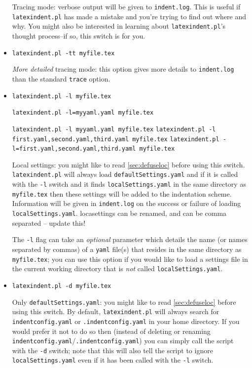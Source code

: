 \documentclass[11pt]{article}
\newcommand{\verbitem}[1]{\small\PVerb{#1}}
\begin{document}
\begin{itemize}[labelsep=.25cm]
	      \label{page:traceswitch}
	      Tracing mode: verbose output will be given to \lstinline!indent.log!. This
	      is useful if \lstinline!latexindent.pl! has made a mistake and you're
	      trying to find out where and why. You might also be interested in learning
	      about \lstinline!latexindent.pl!'s thought process--if so, this
	      switch is for you.
	\item[\verbitem{-tt, --ttrace}] \lstinline!latexindent.pl -tt myfile.tex!

      \emph{More detailed} tracing mode: this option gives more details to \lstinline!indent.log!
      than the standard \lstinline!trace! option.
	\item[\verbitem{-l, --local[=myyaml.yaml]}] \lstinline!latexindent.pl -l myfile.tex!

\lstinline!latexindent.pl -l=myyaml.yaml myfile.tex!

\lstinline!latexindent.pl -l myyaml.yaml myfile.tex!
\lstinline!latexindent.pl -l first.yaml,second.yaml,third.yaml myfile.tex!
\lstinline!latexindent.pl -l=first.yaml,second.yaml,third.yaml myfile.tex!


	      \label{page:localswitch}
	      Local settings: you might like to read \cref{sec:defuseloc} before
	      using this switch. \lstinline!latexindent.pl! will always load \lstinline!defaultSettings.yaml!
	      and if it is called with the \lstinline!-l! switch and it finds \lstinline!localSettings.yaml!
	      in the same directory as \lstinline!myfile.tex! then these settings will be
	      added to the indentation scheme. Information will be given in \lstinline!indent.log! on
	      the success or failure of loading \lstinline!localSettings.yaml!.
          {\huge locasettings can be renamed, and can be comma separated -- update this!}

The \lstinline!-l! flag can take an \emph{optional} parameter which details the name (or names separated by commas) of a \lstinline!yaml! file(s)
that resides in the same directory as \lstinline!myfile.tex!; you can use this option if you would 
like to load a settings file in the current working directory that is \emph{not} called \lstinline!localSettings.yaml!.

	\item[\verbitem{-d, --onlydefault}] \lstinline!latexindent.pl -d myfile.tex!

	      Only \lstinline!defaultSettings.yaml!: you might like to read \cref{sec:defuseloc} before
	      using this switch. By default, \lstinline!latexindent.pl! will always search for
	      \lstinline!indentconfig.yaml! or \lstinline!.indentconfig.yaml!  in your home directory. If you would prefer it not to do so
	      then (instead of deleting or renaming \lstinline!indentconfig.yaml!/\lstinline!.indentconfig.yaml!) you can simply
	      call the script with the \lstinline!-d! switch; note that this will also tell
	      the script to ignore \lstinline!localSettings.yaml! even if it has been called with the
	      \lstinline!-l! switch.


\end{itemize}
\end{document}
